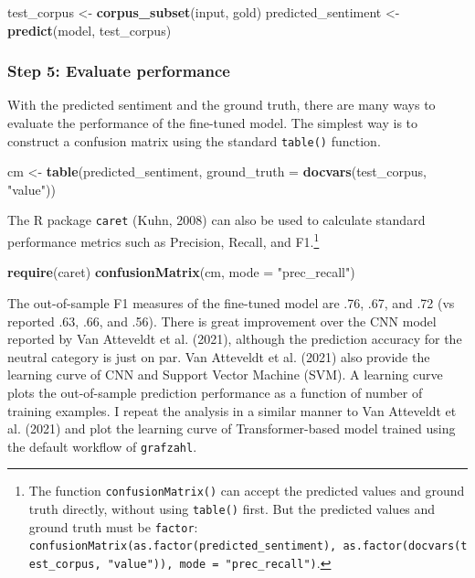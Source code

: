 \documentclass[
  english,
  man,floatsintext]{apa7}
\newenvironment{Shaded}{\begin{snugshade}}{\end{snugshade}}
\newcommand{\DataTypeTok}[1]{\textcolor[rgb]{0.13,0.29,0.53}{#1}}
\newcommand{\KeywordTok}[1]{\textcolor[rgb]{0.13,0.29,0.53}{\textbf{#1}}}
\newcommand{\NormalTok}[1]{#1}
\newcommand{\StringTok}[1]{\textcolor[rgb]{0.31,0.60,0.02}{#1}}
\begin{document}
\begin{Shaded}
\begin{Highlighting}[]
\NormalTok{test\_corpus \textless{}{-}}\StringTok{ }\KeywordTok{corpus\_subset}\NormalTok{(input, gold)}
\NormalTok{predicted\_sentiment \textless{}{-}}\StringTok{ }\KeywordTok{predict}\NormalTok{(model, test\_corpus)}
\end{Highlighting}
\end{Shaded}

\hypertarget{step-5-evaluate-performance}{%
\subsubsection{Step 5: Evaluate performance}\label{step-5-evaluate-performance}}

With the predicted sentiment and the ground truth, there are many ways to evaluate the performance of the fine-tuned model. The simplest way is to construct a confusion matrix using the standard \texttt{table()} function.

\begin{Shaded}
\begin{Highlighting}[]
\NormalTok{cm \textless{}{-}}\StringTok{ }\KeywordTok{table}\NormalTok{(predicted\_sentiment,}
            \DataTypeTok{ground\_truth =} \KeywordTok{docvars}\NormalTok{(test\_corpus, }\StringTok{"value"}\NormalTok{))}
\end{Highlighting}
\end{Shaded}

The R package \texttt{caret} (Kuhn, 2008) can also be used to calculate standard performance metrics such as Precision, Recall, and F1.\footnote{The function \texttt{confusionMatrix()} can accept the predicted values and ground truth directly, without using \texttt{table()} first. But the predicted values and ground truth must be \texttt{factor}: \texttt{confusionMatrix(as.factor(predicted\_sentiment),\ as.factor(docvars(test\_corpus,\ "value")),\ mode\ =\ "prec\_recall")}.}

\begin{Shaded}
\begin{Highlighting}[]
\KeywordTok{require}\NormalTok{(caret)}
\KeywordTok{confusionMatrix}\NormalTok{(cm, }\DataTypeTok{mode =} \StringTok{"prec\_recall"}\NormalTok{)}
\end{Highlighting}
\end{Shaded}

The out-of-sample F1 measures of the fine-tuned model are .76, .67, and .72 (vs reported .63, .66, and .56). There is great improvement over the CNN model reported by Van Atteveldt et al. (2021), although the prediction accuracy for the neutral category is just on par. Van Atteveldt et al. (2021) also provide the learning curve of CNN and Support Vector Machine (SVM). A learning curve plots the out-of-sample prediction performance as a function of number of training examples. I repeat the analysis in a similar manner to Van Atteveldt et al. (2021) and plot the learning curve of Transformer-based model trained using the default workflow of \texttt{grafzahl}.
\end{document}
